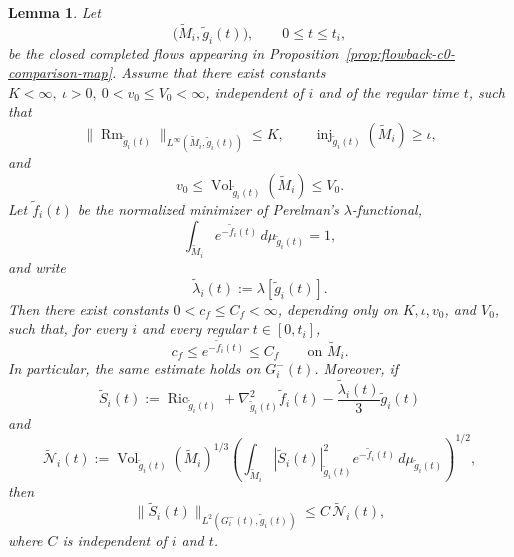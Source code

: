 \documentclass[10pt,a4paper]{amsart}
\newtheorem{lemma}{Lemma}
\begin{document}
\begin{lemma}
\label{lem:uniform-perelman-ground-state}
Let
\[
        \bigl(\widetilde M_i,\widetilde g_i(t)\bigr),
        \qquad 0\leq t\leq t_i,
\]
be the closed completed flows appearing in Proposition~\ref{prop:flowback-c0-comparison-map}.
Assume that there exist constants
$K<\infty,~\iota>0,~0<v_0\leq V_0<\infty$,
independent of \(i\) and of the regular time \(t\), such that
\begin{equation}
\label{eq:uniform-completed-bounded-geometry}
        \bigl\|
                \operatorname{Rm}_{\widetilde g_i(t)}
        \bigr\|_{L^\infty(\widetilde M_i,\widetilde g_i(t))}
        \leq K,
        \qquad
        \operatorname{inj}_{\widetilde g_i(t)}(\widetilde M_i)
        \geq \iota,
\end{equation}
and
\begin{equation}
\label{eq:uniform-completed-volume-bounds}
        v_0
        \leq
        \operatorname{Vol}_{\widetilde g_i(t)}(\widetilde M_i)
        \leq
        V_0.
\end{equation}
Let \(\widetilde f_i(t)\) be the normalized minimizer of
Perelman's \(\lambda\)-functional,
\[
        \int_{\widetilde M_i}
        e^{-\widetilde f_i(t)}
        \,d\mu_{\widetilde g_i(t)}
        =1,
\]
and write
\[
        \widetilde\lambda_i(t)
        :=
        \lambda[\widetilde g_i(t)].
\]
Then there exist constants
$ 0<c_f\leq C_f<\infty$,
depending only on \(K,\iota,v_0\), and \(V_0\), such that, for
every \(i\) and every regular \(t\in[0,t_i]\),
\begin{equation}
\label{eq:uniform-perelman-density-bound}
        c_f
        \leq
        e^{-\widetilde f_i(t)}
        \leq
        C_f
        \qquad\text{on }\widetilde M_i.
\end{equation}
In particular, the same estimate holds on \(G_i^-(t)\).
Moreover, if
\[
        \widetilde S_i(t)
        :=
        \operatorname{Ric}_{\widetilde g_i(t)}
        +
        \nabla_{\widetilde g_i(t)}^2\widetilde f_i(t)
        -
        \frac{\widetilde\lambda_i(t)}{3}
        \widetilde g_i(t)
\]
and
\[
        \widetilde{\mathcal N}_i(t)
        :=
        \operatorname{Vol}_{\widetilde g_i(t)}
        (\widetilde M_i)^{1/3}
        \left(
        \int_{\widetilde M_i}
        |\widetilde S_i(t)|_{\widetilde g_i(t)}^2
        e^{-\widetilde f_i(t)}
        \,d\mu_{\widetilde g_i(t)}
        \right)^{1/2},
\]
then
\begin{equation}
\label{eq:weighted-to-unweighted-soliton-defect}
        \|\widetilde S_i(t)\|_
        {L^2(G_i^-(t),\widetilde g_i(t))}
        \leq
        C\,\widetilde{\mathcal N}_i(t),
\end{equation}
where \(C\) is independent of \(i\) and \(t\).
\end{lemma}
\end{document}
